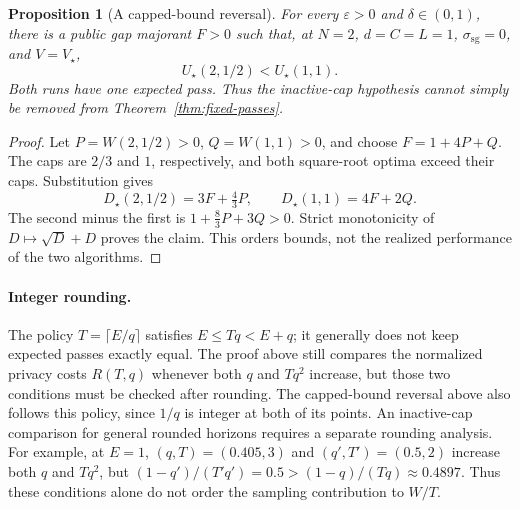 \documentclass[11pt]{article}
\newtheorem{proposition}[theorem]{Proposition}
\newcommand{\sg}{\mathrm{sg}}
\begin{document}
\begin{proposition}[A capped-bound reversal]\label{prop:cap-reversal}
For every $\varepsilon>0$ and $\delta\in(0,1)$, there is a public gap
majorant $F>0$ such that, at $N=2$, $d=C=L=1$, $\sigma_{\sg}=0$, and
$V=V_\star$,
\[
 U_\star(2,1/2)<U_\star(1,1).
\]
Both runs have one expected pass. Thus the inactive-cap hypothesis cannot
simply be removed from Theorem~\ref{thm:fixed-passes}.
\end{proposition}
\begin{proof}
Let $P=W(2,1/2)>0$, $Q=W(1,1)>0$, and choose $F=1+4P+Q$.
The caps are $2/3$ and $1$, respectively, and both square-root optima exceed
their caps. Substitution gives
\[
 D_\star(2,1/2)=3F+\tfrac43P,\qquad
 D_\star(1,1)=4F+2Q.
\]
The second minus the first is $1+\tfrac83P+3Q>0$. Strict monotonicity of
$D\mapsto\sqrt D+D$ proves the claim. This orders bounds, not the realized
performance of the two algorithms.
\end{proof}

\paragraph{Integer rounding.}
The policy $T=\lceil E/q\rceil$ satisfies
$E\le Tq<E+q$; it generally does not keep expected passes exactly equal.
The proof above still compares the normalized privacy costs $R(T,q)$
whenever both $q$ and
$Tq^2$ increase, but those two conditions must be checked after rounding.
The capped-bound reversal above also follows this policy, since $1/q$ is
integer at both of its points. An inactive-cap comparison for general rounded
horizons requires a separate rounding analysis. For example, at $E=1$,
$(q,T)=(0.405,3)$ and $(q',T')=(0.5,2)$ increase both $q$ and $Tq^2$,
but $(1-q')/(T'q')=0.5>(1-q)/(Tq)\approx0.4897$.
Thus these conditions alone do not order the sampling contribution to $W/T$.
\end{document}
